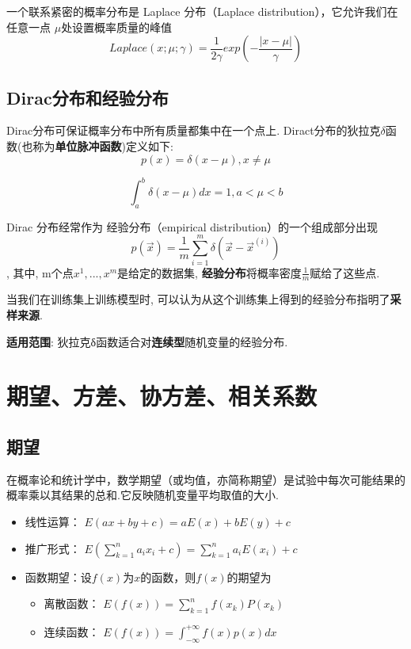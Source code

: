 一个联系紧密的概率分布是 Laplace 分布（Laplace
distribution），它允许我们在任意一点 \(\mu\)处设置概率质量的峰值 \[
Laplace(x;\mu;\gamma)=\frac{1}{2\gamma}exp\left(-\frac{|x-\mu|}{\gamma}\right)
\]

\subsection{Dirac分布和经验分布}\label{diracux5206ux5e03ux548cux7ecfux9a8cux5206ux5e03}

Dirac分布可保证概率分布中所有质量都集中在一个点上.
Diract分布的狄拉克\(\delta​\)函数(也称为\textbf{单位脉冲函数})定义如下:
\[
p(x)=\delta(x-\mu), x\neq \mu
\]

\[
\int_{a}^{b}\delta(x-\mu)dx = 1, a < \mu < b
\]

Dirac 分布经常作为 经验分布（empirical distribution）的一个组成部分出现
\[
\hat{p}(\vec{x})=\frac{1}{m}\sum_{i=1}^{m}\delta(\vec{x}-{\vec{x}}^{(i)})
\] , 其中, m个点\(x^{1},...,x^{m}\)是给定的数据集,
\textbf{经验分布}将概率密度\(\frac{1}{m}​\)赋给了这些点.

当我们在训练集上训练模型时,
可以认为从这个训练集上得到的经验分布指明了\textbf{采样来源}.

\textbf{适用范围}: 狄拉克δ函数适合对\textbf{连续型}随机变量的经验分布.

\begin{quote}
\end{quote}

\section{期望、方差、协方差、相关系数}\label{ux671fux671bux65b9ux5deeux534fux65b9ux5deeux76f8ux5173ux7cfbux6570}

\subsection{ 期望}\label{ux671fux671b}

在概率论和统计学中，数学期望（或均值，亦简称期望）是试验中每次可能结果的概率乘以其结果的总和.它反映随机变量平均取值的大小.

\begin{itemize}
 
\item
  线性运算： \(E(ax+by+c) = aE(x)+bE(y)+c\)\\
\item
  推广形式：
  \(E(\sum_{k=1}^{n}{a_ix_i+c}) = \sum_{k=1}^{n}{a_iE(x_i)+c}\)
\item
  函数期望：设\(f(x)\)为\(x\)的函数，则\(f(x)\)的期望为

  \begin{itemize}
   
  \item
    离散函数： \(E(f(x))=\sum_{k=1}^{n}{f(x_k)P(x_k)}\)
  \item
    连续函数： \(E(f(x))=\int_{-\infty}^{+\infty}{f(x)p(x)dx}\)
  \end{itemize}
\end{itemize}


